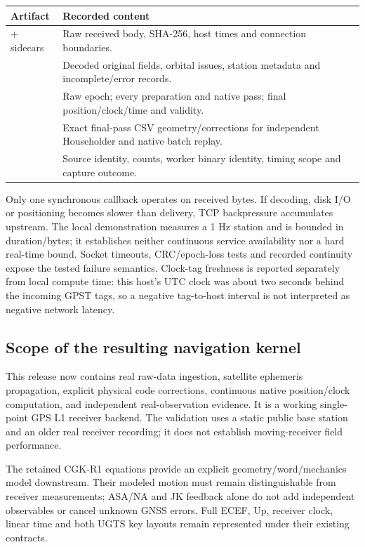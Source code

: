 \begin{center}
\begin{tabularx}{\textwidth}{@{}P{.35\textwidth}Y@{}}\toprule
\textbf{Artifact} & \textbf{Recorded content}\\\midrule
{} + sidecars & Raw received body, SHA-256, host times and connection boundaries.\\
 & Decoded original fields, orbital issues, station metadata and incomplete/error records.\\
 & Raw epoch; every preparation and native pass; final position/clock/time and validity.\\
 & Exact final-pass CSV geometry/corrections for independent Householder and native batch replay.\\
 & Source identity, counts, worker binary identity, timing scope and capture outcome.\\\bottomrule
\end{tabularx}
\end{center}

Only one synchronous callback operates on received bytes. If decoding, disk I/O
or positioning becomes slower than delivery, TCP backpressure accumulates upstream.
The local demonstration measures a 1 Hz station and is bounded in duration/bytes;
it establishes neither continuous service availability nor a hard real-time bound.
Socket timeouts, CRC/epoch-loss tests and recorded continuity expose the tested
failure semantics. Clock-tag freshness is reported separately from local compute
time: this host's UTC clock was about two seconds behind the incoming GPST tags,
so a negative tag-to-host interval is not interpreted as negative network latency.



\clearpage
\subsection{Scope of the resulting navigation kernel}
This release now contains real raw-data ingestion, satellite ephemeris propagation,
explicit physical code corrections, continuous native position/clock computation,
and independent real-observation evidence. It is a working single-point GPS L1
receiver backend. The validation uses a static public base station and an older
real receiver recording; it does not establish moving-receiver field performance.

The retained CGK-R1 equations provide an explicit geometry/word/mechanics model
downstream. Their modeled motion must remain distinguishable from receiver
measurements; ASA/NA and JK feedback alone do not add independent observables or
cancel unknown GNSS errors. Full ECEF, Up, receiver clock, linear time and both
UGTS key layouts remain represented under their existing contracts.

